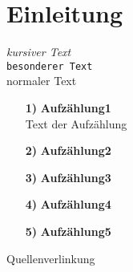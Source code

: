 \chapter{Einleitung}

\textit{kursiver Text} \\
\texttt{besonderer Text} \\
normaler Text
\begin{itemize}
\item[\textbf{1)}] \textbf{Aufzählung1}\\
Text der Aufzählung
\item [\textbf{2)}]\textbf{Aufzählung2}
\item [\textbf{3)}]\textbf{Aufzählung3}
\item [\textbf{4)}]\textbf{Aufzählung4}
\item [\textbf{5)}]\textbf{Aufzählung5}
\end{itemize}
Quellenverlinkung \cite{UCS_XDL_UseCaseSenarios}

